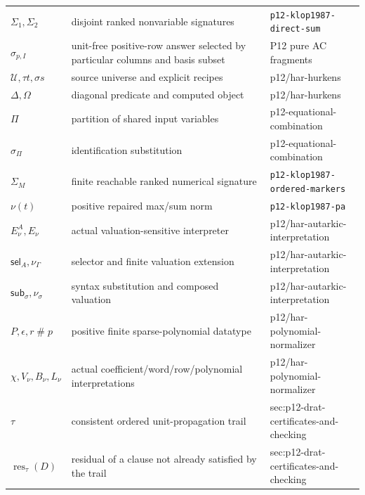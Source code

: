 \begin{longtable}{@{}p{}p{}p{}@{}}
\(\Sigma_1,\allowbreak \Sigma_2\) & disjoint ranked nonvariable signatures & \texttt{p12-\allowbreak{}klop1987-\allowbreak{}direct-\allowbreak{}sum} \\
\(\sigma_{p,I}\) & unit-free positive-row answer selected by particular columns and basis subset & P12 pure AC fragments \\
\(\mathcal U,\allowbreak \tau t,\allowbreak \sigma s\) & source universe and explicit recipes & p12/\allowbreak{}har-\allowbreak{}hurkens \\
\(\Delta,\allowbreak \Omega\) & diagonal predicate and computed object & p12/\allowbreak{}har-\allowbreak{}hurkens \\
\(\Pi\) & partition of shared input variables & p12-\allowbreak{}equational-\allowbreak{}combination \\
\(\sigma_\Pi\) & identification substitution & p12-\allowbreak{}equational-\allowbreak{}combination \\
\(\Sigma_M\) & finite reachable ranked numerical signature & \texttt{p12-\allowbreak{}klop1987-\allowbreak{}ordered-\allowbreak{}markers} \\
\(\nu(t)\) & positive repaired max/sum norm & \texttt{p12-\allowbreak{}klop1987-\allowbreak{}pa} \\
\(E_\nu^A,\allowbreak E_\nu\) & actual valuation-sensitive interpreter & p12/\allowbreak{}har-\allowbreak{}autarkic-\allowbreak{}interpretation \\
\(\mathsf{sel}_A,\allowbreak \nu_\Gamma\) & selector and finite valuation extension & p12/\allowbreak{}har-\allowbreak{}autarkic-\allowbreak{}interpretation \\
\(\mathsf{sub}_\sigma,\allowbreak \nu_\sigma\) & syntax substitution and composed valuation & p12/\allowbreak{}har-\allowbreak{}autarkic-\allowbreak{}interpretation \\
\(P,\allowbreak \epsilon,\allowbreak r\mathbin{\#}p\) & positive finite sparse-polynomial datatype & p12/\allowbreak{}har-\allowbreak{}polynomial-\allowbreak{}normalizer \\
\(\chi,\allowbreak V_\nu,\allowbreak B_\nu,\allowbreak L_\nu\) & actual coefficient/word/row/polynomial interpretations & p12/\allowbreak{}har-\allowbreak{}polynomial-\allowbreak{}normalizer \\
\(\tau\) & consistent ordered unit-propagation trail & sec:\allowbreak{}p12-\allowbreak{}drat-\allowbreak{}certificates-\allowbreak{}and-\allowbreak{}checking \\
\(\operatorname{res}_{\tau}(D)\) & residual of a clause not already satisfied by the trail & sec:\allowbreak{}p12-\allowbreak{}drat-\allowbreak{}certificates-\allowbreak{}and-\allowbreak{}checking \\

\end{longtable}
